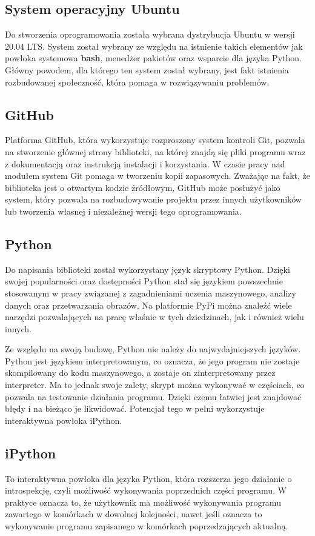 \subsection{System operacyjny Ubuntu}
\quad Do stworzenia oprogramowania została wybrana dystrybucja Ubuntu w wersji 20.04 LTS. System został wybrany ze względu na istnienie takich elementów jak powłoka systemowa \textbf{bash}, menedżer pakietów oraz wsparcie dla języka Python. Główny powodem, dla którego ten system został wybrany, jest fakt istnienia rozbudowanej społeczność, która pomaga w rozwiązywaniu problemów. 

\subsection{GitHub}
\quad Platforma GitHub, która wykorzystuje rozproszony system kontroli Git, pozwala na stworzenie głównej strony biblioteki, na której znajdą się pliki programu wraz z dokumentacją oraz instrukcją instalacji i korzystania. W czasie pracy nad modułem system Git pomaga w tworzeniu kopii zapasowych. Zważając na fakt, że biblioteka jest o otwartym kodzie źródłowym, GitHub może posłużyć jako system, który pozwala na rozbudowywanie projektu przez innych użytkowników lub tworzenia własnej i niezależnej wersji tego oprogramowania. 

\subsection{Python}
\quad Do napisania biblioteki został wykorzystany język skryptowy Python. Dzięki swojej popularności oraz dostępności Python stał się językiem powszechnie stosowanym w pracy związanej z zagadnieniami uczenia maszynowego, analizy danych oraz przetwarzania obrazów. Na platformie PyPi można znaleźć wiele narzędzi pozwalających na pracę właśnie w tych dziedzinach, jak i również wielu innych. 

\quad Ze względu na swoją budowę, Python nie należy do najwydajniejszych języków. Python jest językiem interpretowanym, co oznacza, że jego program nie zostaje skompilowany do kodu maszynowego, a zostaje on zinterpretowany przez interpreter. Ma to jednak swoje zalety, skrypt można wykonywać w częściach, co pozwala na testowanie działania programu. Dzięki czemu łatwiej jest znajdować błędy i na bieżąco je likwidować. Potencjał tego w pełni wykorzystuje interaktywna powłoka iPython. 

\subsection{iPython}
\quad To interaktywna powłoka dla języka Python, która rozszerza jego działanie o introspekcję, czyli możliwość wykonywania poprzednich części programu. W praktyce oznacza to, że użytkownik ma możliwość wykonywania programu zawartego w komórkach w dowolnej kolejności, nawet jeśli oznacza to wykonywanie programu zapisanego w komórkach poprzedzających aktualną. 

